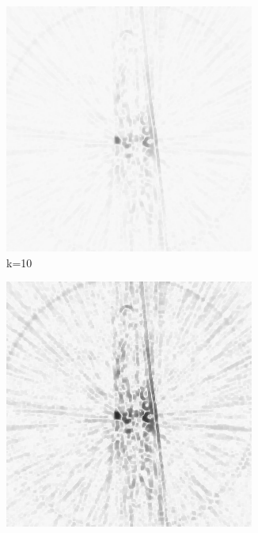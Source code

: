 \documentclass[journal]{IEEEtran}
\begin{document}
\begin{figure}[h]
    \begin{subfigure}[b]{0.24\linewidth}
        \includegraphics[width=\textwidth]{../images/okra/2D_okra/weightsIm_10normalized.png}
        \caption{k=10}
     \end{subfigure}     
  \begin{subfigure}[b]{0.24\linewidth}
        \includegraphics[width=\textwidth]{../images/okra/2D_okra/weightsIm_50normalized.png}

\end{subfigure}
\end{figure}
\end{document}
